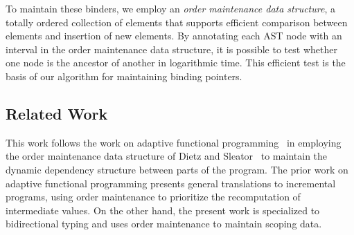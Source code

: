 \documentclass[acmsmall,dvipsnames,10pt,nonacm,sigplan]{acmart}\settopmatter{printfolios=true}
\begin{document}

To maintain these binders, we employ an \textit{order maintenance data structure}, a totally ordered collection of elements that supports efficient comparison between elements and insertion of new elements. By annotating each AST node with an interval in the order maintenance data structure, it is possible to test whether one node is the ancestor of another in logarithmic time. This efficient test is the basis of our algorithm for maintaining binding pointers. 



\subsection*{Related Work}

This work follows the work on adaptive functional programming~\cite{DBLP:conf/popl/AcarBH02} in employing the order maintenance data structure of Dietz and Sleator~\cite{DBLP:conf/stoc/DietzS87} to maintain the dynamic dependency structure between parts of the program. The prior work on adaptive functional programming presents general translations to incremental programs, using order maintenance to prioritize the recomputation of intermediate values. On the other hand, the present work is specialized to bidirectional typing and uses order maintenance to maintain scoping data.
\end{document}
